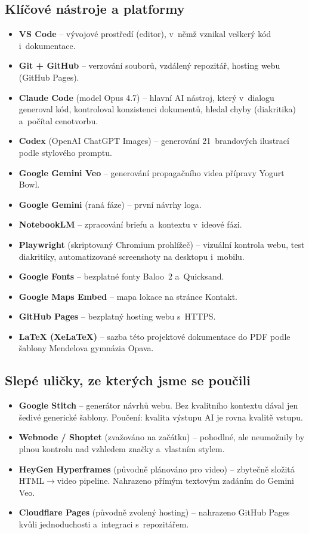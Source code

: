 \documentclass[12pt,a4paper]{article}
\begin{document}
\subsection{Klíčové nástroje a platformy}

\begin{itemize}
  \item \textbf{VS Code} -- vývojové prostředí (editor), v~němž vznikal veškerý kód i~dokumentace.
  \item \textbf{Git + GitHub} -- verzování souborů, vzdálený repozitář, hosting webu (GitHub Pages).
  \item \textbf{Claude Code} (model Opus 4.7) -- hlavní AI nástroj, který v~dialogu generoval kód, kontroloval konzistenci dokumentů, hledal chyby (diakritika) a~počítal cenotvorbu.
  \item \textbf{Codex} (OpenAI ChatGPT Images) -- generování 21~brandových ilustrací podle stylového promptu.
  \item \textbf{Google Gemini Veo} -- generování propagačního videa přípravy Yogurt Bowl.
  \item \textbf{Google Gemini} (raná fáze) -- první návrhy loga.
  \item \textbf{NotebookLM} -- zpracování briefu a~kontextu v~ideové fázi.
  \item \textbf{Playwright} (skriptovaný Chromium prohlížeč) -- vizuální kontrola webu, test diakritiky, automatizované screenshoty na desktopu i~mobilu.
  \item \textbf{Google Fonts} -- bezplatné fonty Baloo~2 a~Quicksand.
  \item \textbf{Google Maps Embed} -- mapa lokace na stránce Kontakt.
  \item \textbf{GitHub Pages} -- bezplatný hosting webu s~HTTPS.
  \item \textbf{LaTeX (XeLaTeX)} -- sazba této projektové dokumentace do PDF podle šablony Mendelova gymnázia Opava.
\end{itemize}

\subsection{Slepé uličky, ze kterých jsme se poučili}

\begin{itemize}
  \item \textbf{Google Stitch} -- generátor návrhů webu. Bez kvalitního kontextu dával jen šedivé generické šablony. Poučení: kvalita výstupu AI je rovna kvalitě vstupu.
  \item \textbf{Webnode / Shoptet} (zvažováno na začátku) -- pohodlné, ale neumožnily by plnou kontrolu nad vzhledem značky a~vlastním stylem.
  \item \textbf{HeyGen Hyperframes} (původně plánováno pro video) -- zbytečně složitá HTML$\rightarrow$video pipeline. Nahrazeno přímým textovým zadáním do Gemini Veo.
  \item \textbf{Cloudflare Pages} (původně zvolený hosting) -- nahrazeno GitHub Pages kvůli jednoduchosti a~integraci s~repozitářem.
\end{itemize}
\end{document}
